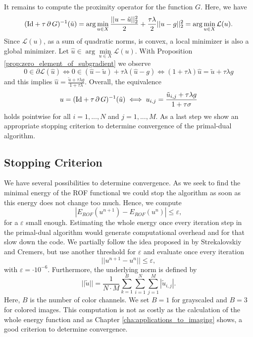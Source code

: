 \documentclass[abstracton]{scrreprt}
\begin{document}
            It remains to compute the proximity operator for the function $G$. Here, we have
                $$
                    (\textnormal{Id} + \tau\,\partial\,G)^{-1}(\tilde{u}) = \arg \min_{u \in X} \frac{||u - \tilde{u}||_{2}^{2}}{2} + \frac{\tau\lambda}{2} ||u - g||_{2}^{2} = \arg \min_{u \in X} \mathcal{L}(u).
                $$
            Since $\mathcal{L}(u)$, as a sum of quadratic norms, is convex, a local minimizer is also a global minimizer. Let $\hat{u} \in \arg \min\limits_{u \in X} \mathcal{L}(u)$. With Proposition \ref{prop:zero_element_of_subgradient} we observe
                $$
                    0 \in \partial \mathcal{L}(\hat{u}) \iff 0 \in (\hat{u} - \tilde{u}) + \tau\lambda (\hat{u} - g) \iff (1 + \tau\lambda)\hat{u} = \tilde{u} + \tau\lambda g
                $$
            and this implies $\hat{u} = \frac{\tilde{u} + \tau\lambda g}{1 + \tau\lambda}$. Overall, the equivalence
                \begin{equation}
                    u = (\textnormal{Id} + \tau\,\partial\,G)^{-1}(\tilde{u}) \iff u_{i,j} = \frac{\tilde{u}_{i,j} + \tau\lambda g}{1 + \tau\sigma}
                \label{eq:proximity_operator_g_rof}
                \end{equation}
            holds pointwise for all $i = 1, ..., N$ and $j = 1, ..., M$. As a last step we show an appropriate stopping criterion to determine convergence of the primal-dual algorithm.

        \subsection{Stopping Criterion} %
        \label{sub:stopping_criterion_rof}

            We have several possibilities to determine convergence. As we seek to find the minimal energy of the ROF functional we could stop the algorithm as soon as this energy does not change too much. Hence, we compute
                $$
                    |E_{ROF}(u^{n+1}) - E_{ROF}(u^{n})| \le \varepsilon,
                $$
             for a $\varepsilon$ small enough. Estimating the whole energy once every iteration step in the primal-dual algorithm would generate computational overhead and for that slow down the code. We partially follow the idea proposed in \cite{Strekalovskiy-Cremers-eccv14} by Strekalovskiy and Cremers, but use another threshold for $\varepsilon$ and evaluate once every iteration
                $$
                    ||u^{n+1} - u^{n}|| \le \varepsilon,
                $$
            with $\varepsilon = \cdot 10^{-6}$. Furthermore, the underlying norm is defined by
                $$
                    ||\tilde{u}|| = \frac{1}{N \cdot M} \sum_{k = 1}^{B} \sum_{i = 1}^{N} \sum_{j = 1}^{M} |\tilde{u}_{i,j}|.
                $$
            Here, $B$ is the number of color channels. We set $B = 1$ for grayscaled and $B = 3$ for colored images. This computation is not as costly as the calculation of the whole energy function and as Chapter \ref{cha:applications_to_imaging} shows, a good criterion to determine convergence.
\end{document}
